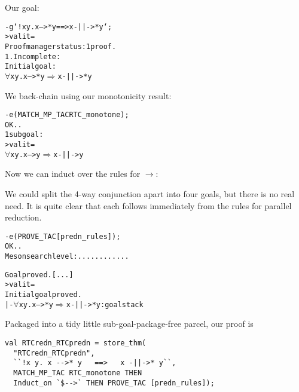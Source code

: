 Our goal:
\begin{session}
\begin{alltt}
- g `!x y. x -->* y ==> x -||->* y`;
> val it =
    Proof manager status: 1 proof.
    1. Incomplete:
         Initial goal:
         \(\forall\)x y. x -->* y \(\Rightarrow\) x -||->* y
\end{alltt}
\end{session}
We back-chain using our monotonicity result:
\begin{session}
\begin{alltt}
- e (MATCH_MP_TAC RTC_monotone);
OK..
1 subgoal:
> val it =
    \(\forall\)x y. x --> y \(\Rightarrow\) x -||-> y
\end{alltt}
\end{session}
Now we can induct over the rules for $\rightarrow$:
We could split the 4-way conjunction apart into four goals, but there
is no real need.  It is quite clear that each follows immediately from
the rules for parallel reduction.
\begin{session}
\begin{alltt}
- e (PROVE_TAC [predn_rules]);
OK..
Meson search level: ............

Goal proved. [...]
> val it =
    Initial goal proved.
    |- \(\forall\)x y. x -->* y \(\Rightarrow\) x -||->* y : goalstack
\end{alltt}
\end{session}
Packaged into a tidy little sub-goal-package-free parcel, our proof is
\begin{session}
\begin{verbatim}
val RTCredn_RTCpredn = store_thm(
  "RTCredn_RTCpredn",
  ``!x y. x -->* y   ==>   x -||->* y``,
  MATCH_MP_TAC RTC_monotone THEN
  Induct_on `$-->` THEN PROVE_TAC [predn_rules]);
\end{verbatim}
\end{session}
\eos{}

